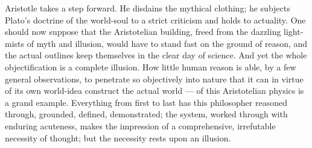 \documentclass[12pt,a4paper]{book}
\begin{document}
Aristotle takes a step forward. He disdains the mythical clothing; he subjects Plato's doctrine of the
world-soul to a strict criticism and holds to actuality. One should now suppose that the Aristotelian
building, freed from the dazzling light-mists of myth and illusion, would have to stand fast on the
ground of reason, and the actual
outlines keep themselves in the clear day of science. And yet the whole objectification is a complete
illusion. How little human reason is able, by a few general observations, to penetrate so objectively
into nature that it can in virtue of its own world-idea construct the actual world --- of this
Aristotelian physics is a grand example. Everything from first to last has this philosopher reasoned
through, grounded, defined, demonstrated; the system, worked through with enduring acuteness, makes the
impression of a comprehensive, irrefutable necessity of thought; but the necessity rests upon an
illusion.
\end{document}

